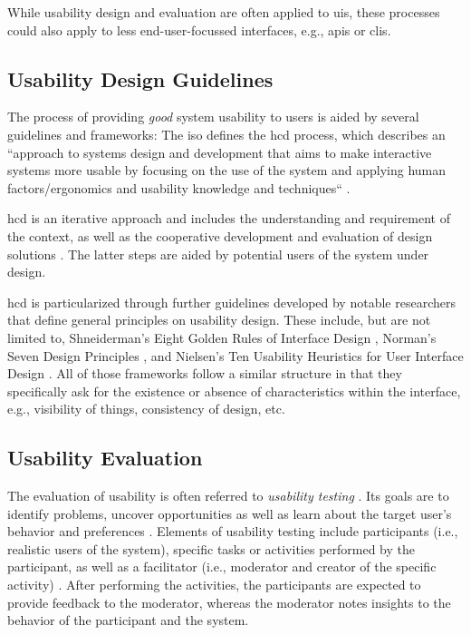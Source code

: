 While usability design and evaluation are often applied to \acp{ui}, these processes could also apply to less end-user-focussed interfaces, e.g., \acp{api} or \acp{cli}.

\subsection{Usability Design Guidelines} \label{subs:foundations-usability-design}

The process of providing \textit{good} system usability to users is aided by several guidelines and frameworks: The \ac{iso} defines the \ac{hcd} process, which describes an ``approach to systems design and development that aims to make interactive systems more usable by focusing on the use of the system and applying human factors/ergonomics and usability knowledge and techniques`` \cite{noauthor_ergonomics_2019}.

\ac{hcd} is an iterative approach and includes the understanding and requirement of the context, as well as the cooperative development and evaluation of design solutions \cite{noauthor_ergonomics_2019}. The latter steps are aided by potential users of the system under design.

\ac{hcd} is particularized through further guidelines developed by notable researchers that define general principles on usability design. These include, but are not limited to, Shneiderman's Eight Golden Rules of Interface Design \cite{shneiderman_designing_2018}, Norman's Seven Design Principles \cite{norman_design_2013}, and Nielsen's Ten Usability Heuristics for User Interface Design \cite{nielsen_10_1994}. All of those frameworks follow a similar structure in that they specifically ask for the existence or absence of characteristics within the interface, e.g., visibility of things, consistency of design, etc.

\subsection{Usability Evaluation} \label{subs:foundations-usability-evaluation}

The evaluation of usability is often referred to \textit{usability testing} \cite{moran_usability_2019}. Its goals are to identify problems, uncover opportunities as well as learn about the target user's behavior and preferences \cite{moran_usability_2019}. Elements of usability testing include participants (i.e., realistic users of the system), specific tasks or activities performed by the participant, as well as a facilitator (i.e., moderator and creator of the specific activity) \cite{moran_usability_2019}. After performing the activities, the participants are expected to provide feedback to the moderator, whereas the moderator notes insights to the behavior of the participant and the system.

